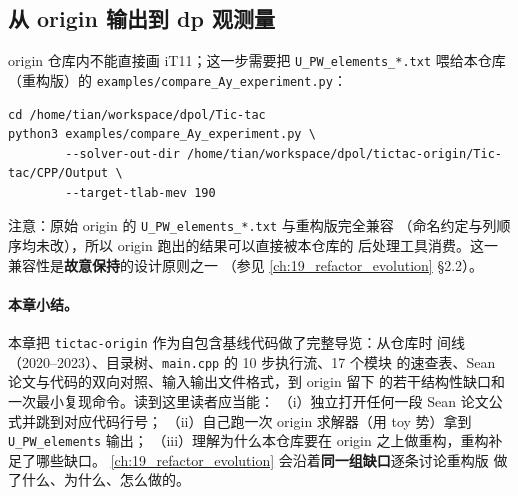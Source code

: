 \subsection{从 origin 输出到 dp 观测量}

origin 仓库内不能直接画 iT11；这一步需要把 \texttt{U\_PW\_elements\_*.txt}
喂给本仓库（重构版）的
\texttt{examples/compare\_Ay\_experiment.py}：
\begin{lstlisting}[style=config]
cd /home/tian/workspace/dpol/Tic-tac
python3 examples/compare_Ay_experiment.py \
        --solver-out-dir /home/tian/workspace/dpol/tictac-origin/Tic-tac/CPP/Output \
        --target-tlab-mev 190
\end{lstlisting}
注意：原始 origin 的 \texttt{U\_PW\_elements\_*.txt} 与重构版完全兼容
（命名约定与列顺序均未改），所以 origin 跑出的结果可以直接被本仓库的
后处理工具消费。这一兼容性是\textbf{故意保持}的设计原则之一
（参见 \cref{ch:19_refactor_evolution} §2.2）。

\paragraph{本章小结。}
本章把 \texttt{tictac-origin} 作为自包含基线代码做了完整导览：从仓库时
间线（2020--2023）、目录树、\texttt{main.cpp} 的 10 步执行流、17 个模块
的速查表、Sean 论文与代码的双向对照、输入输出文件格式，到 origin 留下
的若干结构性缺口和一次最小复现命令。读到这里读者应当能：
（i）独立打开任何一段 Sean 论文公式并跳到对应代码行号；
（ii）自己跑一次 origin 求解器（用 toy 势）拿到 \texttt{U\_PW\_elements} 输出；
（iii）理解为什么本仓库要在 origin 之上做重构，重构补足了哪些缺口。
\cref{ch:19_refactor_evolution} 会沿着\textbf{同一组缺口}逐条讨论重构版
做了什么、为什么、怎么做的。
